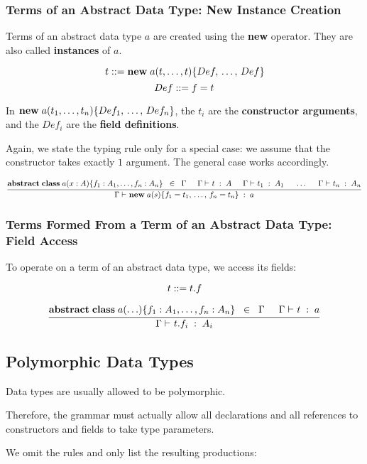\subsubsection{Terms of an Abstract Data Type: New Instance Creation}

Terms of an abstract data type $a$ are created using the \textbf{new} operator.
They are also called \textbf{instances} of $a$.

\[t \bbc \anewA{a}{t,\ldots,t}{Def,\ldots,Def}\]
\[Def ::= f=t\]

In $\anewA{a}{t_1,\ldots,t_n}{Def_1,\ldots,Def_n}$, the $t_i$ are the \textbf{constructor arguments}, and the $Def_i$ are the \textbf{field definitions}.

Again, we state the typing rule only for a special case: we assume that the constructor takes exactly $1$ argument.
The general case works accordingly.

\[\rul{\aclassAI{a}{x:A}{}{f_1:A_1,\ldots,f_n:A_n}\;\;\in\;\;\Gamma\tb
       \oftype{}{\Gamma}{t}{A} \tb
       \oftype{}{\Gamma}{t_1}{A_1}\tb\ldots\tb\oftype{}{\Gamma}{t_n}{A_n}}
      {\oftype{}{\Gamma}{\anewA{a}{s}{f_1=t_1,\ldots,f_n=t_n}}{a}}\]


\subsubsection{Terms Formed From a Term of an Abstract Data Type: Field Access}

To operate on a term of an abstract data type, we access its fields:

\[t ::= t.f\]

\[\rul{\aclassAI{a}{\ldots}{}{f_1:A_1,\ldots,f_n:A_n}\;\;\in\;\;\Gamma\tb
       \oftype{}{\Gamma}{t}{a}}
      {\oftype{}{\Gamma}{t.f_i}{A_i}}\]

\subsection{Polymorphic Data Types}

Data types are usually allowed to be polymorphic.

Therefore, the grammar must actually allow all declarations and all references to constructors and fields to take type parameters.

We omit the rules and only list the resulting productions:

